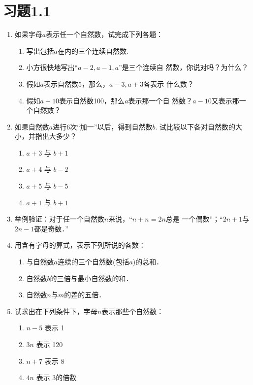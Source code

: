 \section*{习题1.1}

\begin{enumerate}
	\item 如果字母$a$表示任一个自然数，试完成下列各题：
	\begin{enumerate}
		\item 写出包括$a$在内的三个连续自然数.
		\item 小方很快地写出“$a-2, a-1, a$”是三个连续自
		然数，你说对吗？为什么？
		\item 假如$a$表示自然数5，那么，$a-3,a+3$各表示
		什么数？
		\item 假如$a+10$表示自然数100，那么$a$表示那一个自
		然数？$a-10$又表示那一个自然数？
		
	\end{enumerate}
	
	\item  如果自然数$a$进行6次“加一”以后，得到自然数$b$.
	试比较以下各对自然数的大小，并指出大多少？
	\begin{multicols}{2}
		\begin{enumerate}
			\item $a+3$ 与 $b+1$
			\item $a+4$ 与 $b-2$
			\item $a+5$ 与 $b-5$
			\item $a+1$ 与 $b+1$
		\end{enumerate}
	\end{multicols}
	
	\item  举例验证：对于任一个自然数$n$来说，“$n+n=2n$总是
	一个偶数”；“$2n + 1$与$2n-1$都是奇数．”
	
	\item 用含有字母的算式，表示下列所说的各数：
	\begin{enumerate}
		\item 与自然数$a$连续的三个自然数(包括$a$)的总和．
		\item 自然数$b$的三倍与最小自然数的和．
		\item 自然数$n$与$m$的差的五倍．
	\end{enumerate}
	
	\item 试求出在下列条件下，字母$n$表示那些个自然数：
	\begin{enumerate}
		\item $n-5$ 表示 1
		\item  $3n$ 表示 120
		\item  $n+7$ 表示 8
		\item  $4n$ 表示 3的倍数
	\end{enumerate}
	

\end{enumerate}
